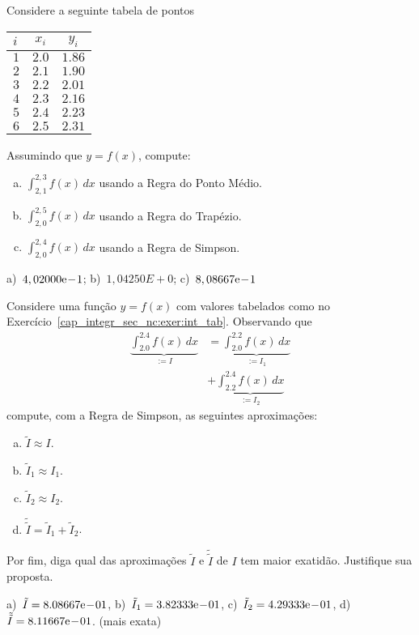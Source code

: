 \begin{exer}\label{cap_integr_sec_nc:exer:int_tab}
  Considere a seguinte tabela de pontos
  \begin{center}
    \begin{tabular}{l|cc}\toprule
      $i$ & $x_i$ & $y_i$\\\midrule
      $1$ & $2.0$ & $1.86$\\
      $2$ & $2.1$ & $1.90$\\
      $3$ & $2.2$ & $2.01$\\
      $4$ & $2.3$ & $2.16$\\
      $5$ & $2.4$ & $2.23$\\
      $6$ & $2.5$ & $2.31$\\\bottomrule
    \end{tabular}
  \end{center}
Assumindo que $y = f(x)$, compute:
\begin{enumerate}[a)]
\item $\displaystyle \int_{2,1}^{2,3} f(x)\,dx$ usando a Regra do Ponto Médio.
\item $\displaystyle \int_{2,0}^{2,5} f(x)\,dx$ usando a Regra do Trapézio.
\item $\displaystyle \int_{2,0}^{2,4} f(x)\,dx$ usando a Regra de Simpson.
\end{enumerate}
\end{exer}
\begin{resp}
  a)~$4,02000\mathrm{e}\!-\!1$; b)~$1,04250E+0$; c)~$8,08667\mathrm{e}\!-\!1$
\end{resp}

\begin{exer}
  Considere uma função $y = f(x)$ com valores tabelados como no Exercício~\ref{cap_integr_sec_nc:exer:int_tab}. Observando que
  \begin{equation}
    \begin{aligned}
      \underbrace{\int_{2.0}^{2.4}f(x)\,dx}_{:= I} &= \underbrace{\int_{2.0}^{2.2}f(x)\,dx}_{:= I_1}\\
      &+ \underbrace{\int_{2.2}^{2.4}f(x)\,dx}_{:= I_2}
  \end{aligned}
  \end{equation}
  compute, com a Regra de Simpson, as seguintes aproximações:
  \begin{enumerate}[a)]
  \item $\tilde{I} \approx I$.
  \item $\tilde{I}_1 \approx I_1$.
  \item $\tilde{I}_2 \approx I_2$.
  \item $\tilde{\tilde{I}} = \tilde{I}_1 + \tilde{I}_2$.
  \end{enumerate}
  Por fim, diga qual das aproximações $\tilde{I}$ e $\tilde{\tilde{I}}$ de $I$ tem maior exatidão. Justifique sua proposta.
\end{exer}
\begin{resp}
  a)~$\tilde{I} = 8.08667\mathrm{e}\!-\!01$, b)~$\tilde{I}_1 = 3.82333\mathrm{e}\!-\!01$, c)~$\tilde{I}_2 = 4.29333\mathrm{e}\!-\!01$, d)~$\tilde{\tilde{I}} = 8.11667\mathrm{e}\!-\!01$. (mais exata)
\end{resp}


